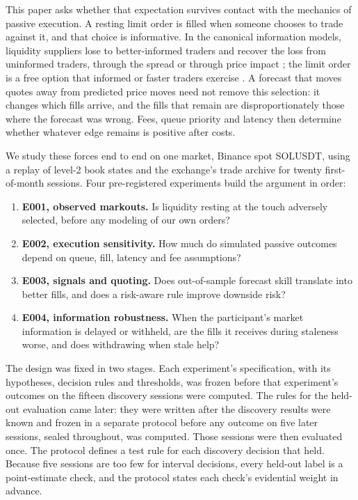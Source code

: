 \documentclass[11pt]{article}
\begin{document}
This paper asks whether that expectation survives contact with the mechanics of passive execution. A resting limit
order is filled when someone chooses to trade against it, and that choice is informative. In the canonical information models,
liquidity suppliers lose to better-informed traders and recover the loss from uninformed traders, through the spread
\citep{glosten1985} or through price impact \citep{kyle1985}; the limit order is a free option that informed or faster traders exercise
\citep{copeland1983,foucault2003}. A forecast that moves quotes away from predicted price moves need not remove this
selection: it changes which fills arrive, and the fills that remain are disproportionately those where the forecast was
wrong. Fees,
queue priority and latency then determine whether whatever edge remains is positive after costs.

We study these forces end to end on one market, Binance spot SOLUSDT, using a replay of level-2 book states and the
exchange's trade archive for twenty first-of-month sessions. Four pre-registered experiments build the argument in
order:
\begin{enumerate}
  \item \textbf{E001, observed markouts.} Is liquidity resting at the touch adversely selected, before any modeling of our
  own orders?
  \item \textbf{E002, execution sensitivity.} How much do simulated passive outcomes depend on queue, fill, latency and
  fee assumptions?
  \item \textbf{E003, signals and quoting.} Does out-of-sample forecast skill translate into better fills, and does a
  risk-aware rule improve downside risk?
  \item \textbf{E004, information robustness.} When the participant's market information is delayed or withheld, are
  the fills it receives during staleness worse, and does withdrawing when stale help?
\end{enumerate}

The design was fixed in two stages. Each experiment's specification, with its hypotheses, decision rules and
thresholds, was frozen before that experiment's outcomes on the fifteen discovery sessions were computed. The rules for
the held-out evaluation came later: they were written after the discovery results were known and frozen in a separate
protocol before any outcome on five later sessions, sealed throughout, was computed. Those sessions were then evaluated
once. The protocol defines a test rule for each discovery decision that held. Because five sessions are too
few for interval decisions, every held-out label is a point-estimate check, and the protocol states each check's
evidential weight in advance.
\end{document}

